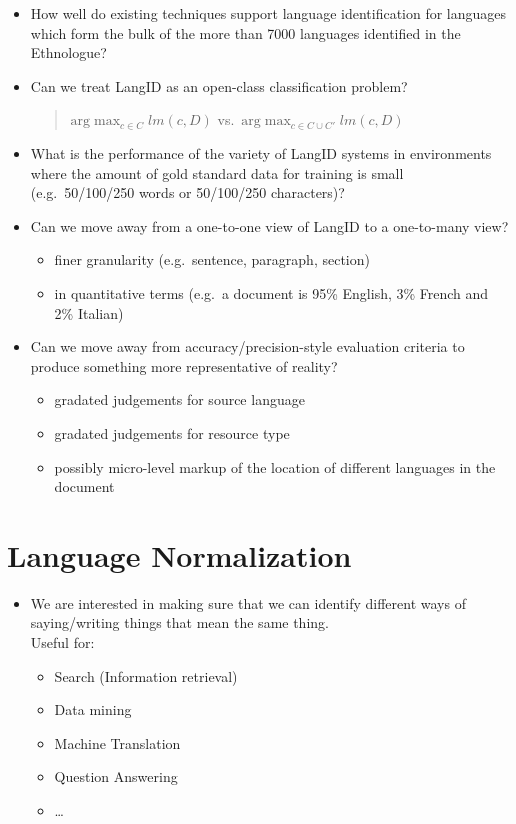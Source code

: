 \documentclass[a4paper,landscape,headrule,footrule,xetex]{foils}
\begin{document}
\begin{itemize}
\item How well do existing techniques support language identification
  for languages which form the bulk of the more than 7000 languages
  identified in the Ethnologue?
\item Can we treat LangID as an open-class classification problem?
  \begin{quote}
    $\mathrm{arg} \max_{c\in C} lm(c,D)$ vs.\ $\mathrm{arg} \max_{c\in
      C\cup C'} lm(c,D)$
  \end{quote}
\item What is the performance of the variety of LangID systems in
  environments where the amount of gold standard data for training is
  small (e.g.\ 50/100/250 words or 50/100/250 characters)?
\item Can we move away from a one-to-one view of LangID to a
  one-to-many view?
  \begin{itemize}
  \item finer granularity (e.g.\ sentence, paragraph, section)
  \item in quantitative terms (e.g.\ a document is 95\% English, 3\%
    French and 2\% Italian)
  \end{itemize}
\newpage

\item Can we move away from accuracy/precision-style evaluation criteria to produce
  something more representative of reality?
  \begin{itemize}
  \item gradated judgements for source language
  \item gradated judgements for resource type
  \item possibly micro-level markup of the location of different
    languages in the document
  \end{itemize}
\end{itemize}

 



\section{Language Normalization}


\begin{itemize}
\item We are interested in making sure that we can identify different
  ways of saying/writing things that mean the same thing.
  \\ Useful for:
  \begin{itemize}
  \item Search (Information retrieval)
  \item Data mining
  \item Machine Translation
  \item Question Answering
  \item \ldots
  \end{itemize}
\end{itemize}
\end{document}
